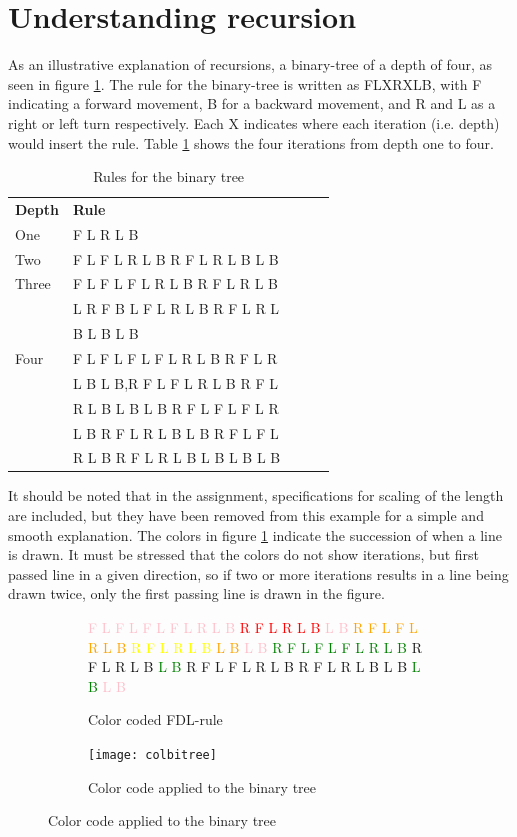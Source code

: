 \documentclass[titlepage]{article}
\newcommand{\pink}{\textcolor{pink}}
\newcommand{\red}{\textcolor{red}}
\newcommand{\orange}{\textcolor{orange}}
\newcommand{\yellow}{\textcolor{yellow}}
\newcommand{\green}{\textcolor{green}}
\newcommand{\lgreen}{\textcolor{lgreen}}
\newcommand{\dblue}{\textcolor{dblue}}
\newcommand{\lblue}{\textcolor{lblue}}
\begin{document}
\section{Understanding recursion}
As an illustrative explanation of recursions, a binary-tree of a depth of four, as seen in figure \ref{fig:coltree}. The rule for the binary-tree is written as FLXRXLB, with F indicating a forward movement, B for a backward movement, and R and L as a right or left turn respectively. Each X indicates where each iteration (i.e. depth) would insert the rule. Table \ref{table:binary}  shows the four iterations from depth one to four. 
\begin{table}[H]
\centering
\caption{Rules for the binary tree}
\label{table:binary}
\begin{tabular}{lllll}
  \textbf{Depth} & \textbf{Rule}\\
  One   & F L R L B \\
  Two   & F L F L R L B R F L R L B L B\\
  Three &F L F L F L R L B R F L R L B \\
        & L R F B L F L R L B R F L R L  \\
  &B L B L B\\
  Four  & F L F L F L F L R L B R F L R\\
   & L B L B,R F L F L R L B R F L\\
   & R L B L B L B R F L F L F L R\\
   & L B R F L R L B L B R F L F L\\
   & R L B R F L R L B L B L B L B\\
  \end{tabular}
\end{table}
It should be noted that in the assignment, specifications for scaling of the length are included, but they have been removed from this example for a simple and smooth explanation. The colors in figure \ref{fig:coltree} indicate the succession of when a line is drawn. It must be stressed that the colors do not show iterations, but first passed line in a given direction, so if two or more iterations results in a line being drawn twice, only the first passing line is drawn in the figure. \newline

\begin{figure}[H]
  \caption{Binary tree with depth 4}
  \centering
  \begin{subfigure}[b]{0.4\textwidth}
    \pink{F L F L F L F L R L B} \red{R F L R L B} \pink{L B} \orange{R F L F L R L B} \yellow{R F L R L B} \orange{L B} \pink{L B} \green{R F L F L F L R L B} \lgreen{R F L R L B} \green{L B} \dblue{R F L F L R L B} \lblue{R F L R L B} \dblue{L B} \green{L B} \pink{L B}
    \caption{Color coded FDL-rule}
  \end{subfigure}
  \begin{subfigure}[b]{0.5\textwidth}
    \texttt{[image: colbitree]}
    \caption{Color code applied to the binary tree}
  \end{subfigure}
  \label{fig:coltree}
\end{figure}
\end{document}
